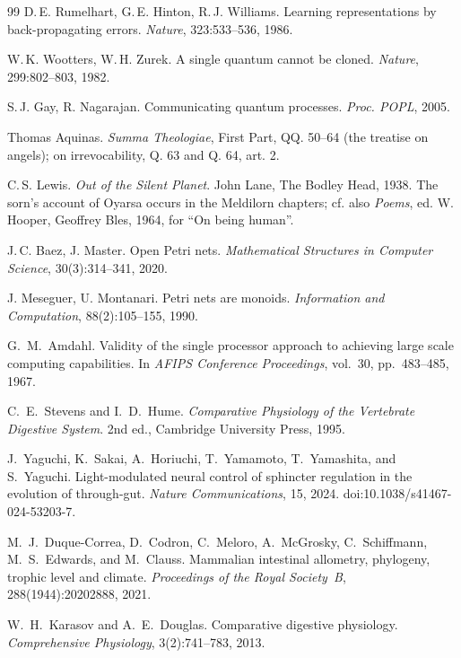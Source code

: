 \begin{thebibliography}{99}
D.\,E. Rumelhart, G.\,E. Hinton, R.\,J. Williams. Learning
representations by back-propagating errors. \emph{Nature}, 323:533--536, 1986.

W.\,K. Wootters, W.\,H. Zurek. A single quantum cannot be
cloned. \emph{Nature}, 299:802--803, 1982.

S.\,J. Gay, R. Nagarajan. Communicating quantum processes.
\emph{Proc. POPL}, 2005.

Thomas Aquinas. \emph{Summa Theologiae}, First Part, QQ.
50--64 (the treatise on angels); on irrevocability, Q. 63 and Q. 64, art. 2.

C.\,S. Lewis. \emph{Out of the Silent Planet}. John Lane,
The Bodley Head, 1938. The sorn's account of Oyarsa occurs in the Meldilorn
chapters; cf. also \emph{Poems}, ed. W. Hooper, Geoffrey Bles, 1964, for ``On
being human''.

J.\,C. Baez, J. Master. Open Petri nets. \emph{Mathematical
Structures in Computer Science}, 30(3):314--341, 2020.

J. Meseguer, U. Montanari. Petri nets are monoids.
\emph{Information and Computation}, 88(2):105--155, 1990.


G.~M.~Amdahl. \newblock Validity of the single processor approach to achieving large scale computing capabilities. \newblock In \emph{AFIPS Conference Proceedings}, vol.~30, pp.~483--485, 1967.

C.~E.~Stevens and I.~D.~Hume. \newblock \emph{Comparative Physiology of the Vertebrate Digestive System}. \newblock 2nd ed., Cambridge University Press, 1995.

J.~Yaguchi, K.~Sakai, A.~Horiuchi, T.~Yamamoto, T.~Yamashita, and S.~Yaguchi. \newblock Light-modulated neural control of sphincter regulation in the evolution of through-gut. \newblock \emph{Nature Communications}, 15, 2024. \newblock doi:10.1038/s41467-024-53203-7.

M.~J.~Duque-Correa, D.~Codron, C.~Meloro, A.~McGrosky, C.~Schiffmann, M.~S.~Edwards, and M.~Clauss. \newblock Mammalian intestinal allometry, phylogeny, trophic level and climate. \newblock \emph{Proceedings of the Royal Society~B}, 288(1944):20202888, 2021.

W.~H.~Karasov and A.~E.~Douglas. \newblock Comparative digestive physiology. \newblock \emph{Comprehensive Physiology}, 3(2):741--783, 2013.


\end{thebibliography}
